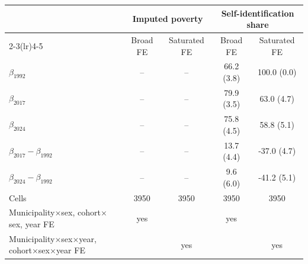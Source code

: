 \begin{tabular}{lcccc}
\toprule
 & \multicolumn{2}{c}{Imputed poverty} & \multicolumn{2}{c}{Self-identification share} \\
\cmidrule(lr){2-3}\cmidrule(lr){4-5}
 & Broad FE & Saturated FE & Broad FE & Saturated FE \\
\midrule
$\beta_{1992}$ & -- & -- & 66.2 (3.8) & 100.0 (0.0) \\
$\beta_{2017}$ & -- & -- & 79.9 (3.5) & 63.0 (4.7) \\
$\beta_{2024}$ & -- & -- & 75.8 (4.5) & 58.8 (5.1) \\
\midrule
$\beta_{2017}-\beta_{1992}$ & -- & -- & 13.7 (4.4) & -37.0 (4.7) \\
$\beta_{2024}-\beta_{1992}$ & -- & -- & 9.6 (6.0) & -41.2 (5.1) \\
\midrule
Cells & 3950 & 3950 & 3950 & 3950 \\
Municipality$\times$sex, cohort$\times$sex, year FE & yes & & yes & \\
Municipality$\times$sex$\times$year, cohort$\times$sex$\times$year FE & & yes & & yes \\
\bottomrule
\end{tabular}
